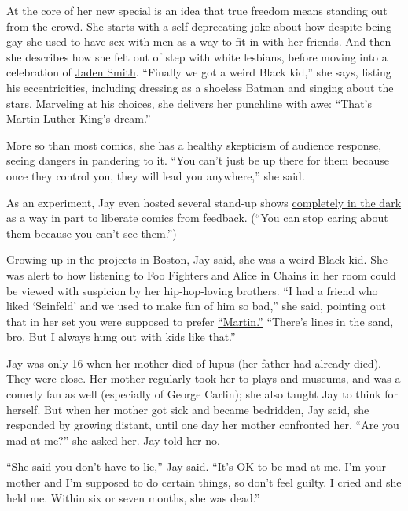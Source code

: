 At the core of her new special is an idea that true freedom means
standing out from the crowd. She starts with a self-deprecating joke
about how despite being gay she used to have sex with men as a way to
fit in with her friends. And then she describes how she felt out of step
with white lesbians, before moving into a celebration of
\href{https://www.cheatsheet.com/entertainment/these-are-the-most-bizarre-things-jaden-smith-ever-said.html/}{Jaden
Smith}. ``Finally we got a weird Black kid,'' she says, listing his
eccentricities, including dressing as a shoeless Batman and singing
about the stars. Marveling at his choices, she delivers her punchline
with awe: ``That's Martin Luther King's dream.''

More so than most comics, she has a healthy skepticism of audience
response, seeing dangers in pandering to it. ``You can't just be up
there for them because once they control you, they will lead you
anywhere,'' she said.

As an experiment, Jay even hosted several stand-up shows
\href{https://thestandnyc.com/shows/show/1129/20191108-1159-pm-nycf-presents-black-out-comedy-in-the-dark-with-sam-jay}{completely
in the dark} as a way in part to liberate comics from feedback. (``You
can stop caring about them because you can't see them.'')

Growing up in the projects in Boston, Jay said, she was a weird Black
kid. She was alert to how listening to Foo Fighters and Alice in Chains
in her room could be viewed with suspicion by her hip-hop-loving
brothers. ``I had a friend who liked `Seinfeld' and we used to make fun
of him so bad,'' she said, pointing out that in her set you were
supposed to prefer
\href{https://theundefeated.com/features/martin-lawrences-martin-20-years-later/}{``Martin.''}
``There's lines in the sand, bro. But I always hung out with kids like
that.''

Jay was only 16 when her mother died of lupus (her father had already
died). They were close. Her mother regularly took her to plays and
museums, and was a comedy fan as well (especially of George Carlin); she
also taught Jay to think for herself. But when her mother got sick and
became bedridden, Jay said, she responded by growing distant, until one
day her mother confronted her. ``Are you mad at me?'' she asked her. Jay
told her no.

``She said you don't have to lie,'' Jay said. ``It's OK to be mad at me.
I'm your mother and I'm supposed to do certain things, so don't feel
guilty. I cried and she held me. Within six or seven months, she was
dead.''

